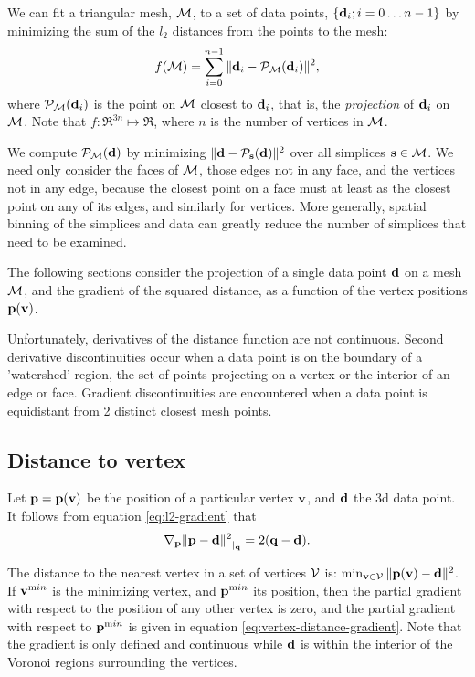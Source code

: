 \label{sec:data-fitting}

We can fit a triangular mesh, ${\mathcal M}$, to a set of data points, $\{{\mathbf d}_i; i=0 \ldots n-1\}$
by minimizing the sum of the $l_2$ distances from the points to the mesh:
\begin{equation}
f({\mathcal M}) = \sum_{i=0}^{n-1} \| {\mathbf d}_i - {\mathcal P}_{\mathcal M} ({\mathbf d}_i) \|^2 ,
\end{equation}
where ${\mathcal P}_{\mathcal M} ({\mathbf d}_i)$ is the point on ${\mathcal M}$ closest to ${\mathbf d}_i$,
that is, the {\em projection} of ${\mathbf d}_i$ on ${\mathcal M}$.
Note that $f:\Re^{3n} \mapsto \Re$,
where $n$ is the number of vertices in ${\mathcal M}$.

We compute ${\mathcal P}_{\mathcal M} ({\mathbf d})$ by minimizing  $\| {\mathbf d} - {\mathcal P}_{\mathbf s} ({\mathbf d}) \|^2$
over all simplices ${\mathbf s} \in {\mathcal M}$.
We need only consider the faces of ${\mathcal M}$,
those edges not in any face,
and the vertices not in any edge,
because the closest point on a face must at least
as the closest point on any of its edges,
and similarly for vertices.
More generally, spatial binning of the simplices and data can greatly
reduce the number of simplices that need to be examined.

The following sections consider the projection of a single
data point ${\mathbf d}$ on a mesh ${\mathcal M}$,
and the gradient of the squared distance,
as a function of the vertex positions ${\mathbf p}({\mathbf v})$.

Unfortunately, derivatives of the distance function are not continuous.
Second derivative discontinuities occur
when a data point is on the boundary
of a 'watershed' region, the set of points
projecting on a vertex or the interior of an edge or face.
Gradient discontinuities are encountered
when a data point is equidistant from 2 distinct closest mesh points.

\subsection{Distance to vertex}
\label{sec:Distance-to-vertex}

Let ${\mathbf p} = {\mathbf p}({\mathbf v})$ be the position of a particular vertex ${\mathbf v}$,
and ${\mathbf d}$ the 3d data point.
It follows from equation \ref{eq:l2-gradient} that
\begin{equation}
\label{eq:vertex-distance-gradient}
{\mathbf \nabla}_{{\mathbf p}}{{\| {\mathbf p} - {\mathbf d} \|^2}}_{\mid_{{\mathbf q}}} = 2 ( {\mathbf q} - {\mathbf d} ).
\end{equation}

The distance to the nearest vertex in a set of vertices ${\mathcal V}$ is:
$\min_{{\mathbf v} \in {\mathcal V}} \| {\mathbf p}({\mathbf v}) - {\mathbf d} \|^2$.
If ${\mathbf v}^{\mathrm min}$ is the minimizing vertex,
and
${\mathbf p}^{\mathrm min}$ its position,
then the partial gradient with respect
to the position of any other vertex is zero,
and the partial gradient with respect to ${\mathbf p}^{\mathrm min}$
is given in equation \ref{eq:vertex-distance-gradient}.
Note that the gradient is only defined and continuous
while ${\mathbf d}$ is within the interior of the
Voronoi regions surrounding the vertices.

